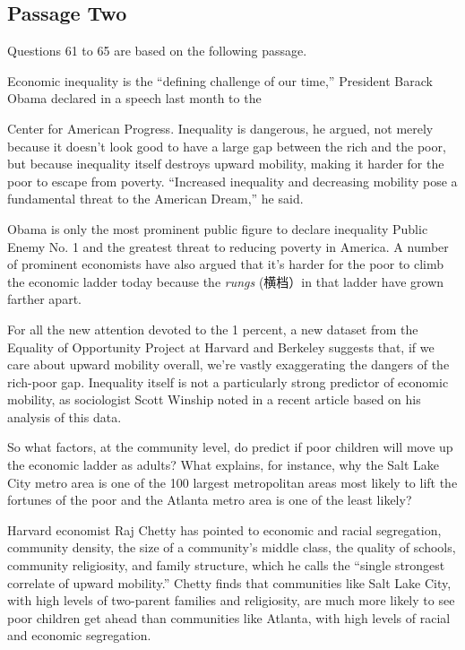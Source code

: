 \documentclass[UTF8,11pt]{ctexart}
\begin{document}
\subsection*{Passage Two}


Questions 61 to 65 are based on the following passage.


Economic inequality is the “defining challenge of our time,” President Barack Obama declared in a speech last month to the


Center for American Progress. Inequality is dangerous, he argued, not merely because it doesn’t look good to have a large gap between the rich and the poor, but because inequality itself destroys upward mobility, making it harder for the poor to escape from poverty. “Increased inequality and decreasing mobility pose a fundamental threat to the American Dream,” he said.


Obama is only the most prominent public figure to declare inequality Public Enemy No. 1 and the greatest threat to reducing poverty in America. A number of prominent economists have also argued that it’s harder for the poor to climb the economic ladder today because the\textit{ rungs} (横档）in that ladder have grown farther apart.


For all the new attention devoted to the 1 percent, a new dataset from the Equality of Opportunity Project at Harvard and Berkeley suggests that, if we care about upward mobility overall, we’re vastly exaggerating the dangers of the rich-poor gap. Inequality itself is not a particularly strong predictor of economic mobility, as sociologist Scott Winship noted in a recent article based on his analysis of this data.


So what factors, at the community level, do predict if poor children will move up the economic ladder as adults? What explains, for instance, why the Salt Lake City metro area is one of the 100 largest metropolitan areas most likely to lift the fortunes of the poor and the Atlanta metro area is one of the least likely?


Harvard economist Raj Chetty has pointed to economic and racial segregation, community density, the size of a community’s middle class, the quality of schools, community religiosity, and family structure, which he calls the “single strongest correlate of upward mobility.” Chetty finds that communities like Salt Lake City, with high levels of two-parent families and religiosity, are much more likely to see poor children get ahead than communities like Atlanta, with high levels of racial and economic segregation.
\end{document}
